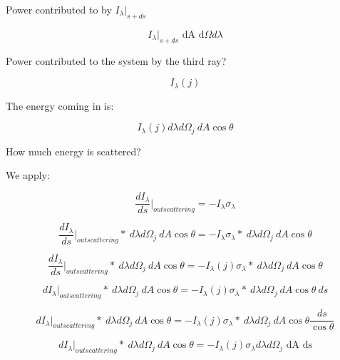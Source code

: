 \documentclass[12pt]{article}
\renewcommand{\_}{\kern-1.5pt\textunderscore\kern-1.5pt}
\begin{document}
Power contributed to by  \( I_{ \lambda }\vert _{s+ds} \) \par

 \[ I_{ \lambda }\vert_{s+ds}\text{ dA d}\Omega d\lambda\] \par

Power contributed to the system by the third ray?\par

 \[ I_{ \lambda } \left( j \right)  \] \par

The energy coming in is:\par

 \[ I_{ \lambda } \left( j \right) d \lambda  d \Omega _{j}~dA\cos  \theta  \] \par


\vspace{\baselineskip}
How much energy is scattered?\par

We apply:\par

 \[ \frac{dI_{ \lambda }}{ds}\vert _{outscattering}=-I_{ \lambda } \sigma _{ \lambda } \] \par

 \[ \frac{dI_{ \lambda }}{ds}\vert _{outscattering}\ast~d \lambda  d \Omega _{j}~dA\cos  \theta =-I_{ \lambda } \sigma _{ \lambda }\ast~d \lambda  d \Omega _{j}~dA\cos  \theta  \] \par

 \[ \frac{dI_{ \lambda }}{ds}\vert _{outscattering}\ast~d \lambda  d \Omega _{j}~dA\cos  \theta =-I_{ \lambda } \left( j \right)  \sigma _{ \lambda }\ast~d \lambda  d \Omega _{j}~dA\cos  \theta  \] \par

 \[ dI_{ \lambda }\vert _{outscattering}\ast~d \lambda  d \Omega _{j}~dA\cos  \theta =-I_{ \lambda } \left( j \right)  \sigma _{ \lambda }\ast~d \lambda  d \Omega _{j}~dA\cos  \theta ~ds \] \par

 \[ dI_{ \lambda }\vert _{outscattering}\ast~d \lambda  d \Omega _{j}~dA\cos  \theta =-I_{ \lambda } \left( j \right)  \sigma _{ \lambda }\ast~d \lambda  d \Omega _{j}~dA\cos  \theta \frac{ds}{\cos  \theta } \] \par

 \[ dI_{ \lambda }\vert _{outscattering}\ast~d \lambda  d \Omega _{j}~dA\cos  \theta =-I_{ \lambda } \left( j \right)  \sigma _{ \lambda }d \lambda  d \Omega _{j}\text{ dA ds} \] \par
\end{document}
